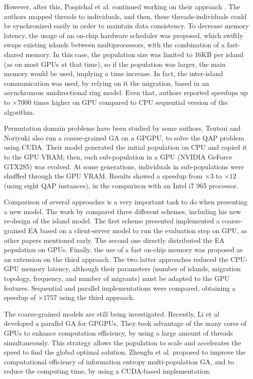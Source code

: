 \documentclass{article}
\begin{document}
However, after this, Pospichal et al. continued working on their approach \cite{pospichalParallelGeneticAlgorithOnCUDA2010,9253}. The authors mapped threads to individuals, and then, these threads-individuals could be synchronized easily in order to maintain data consistency. To decrease memory latency, the usage of an on-chip hardware scheduler was proposed, which swiftly swaps existing islands between multiprocessors, with the combination of a fast-shared memory. In this case, the population size was limited to 16KB per island (as on most GPUs at that time), so if the population was larger, the main memory would be used, implying a time increase. In fact, the inter-island communication was used, by relying on it the migration, based in an asynchronous unidirectional ring model. Even that, authors reported speedups up to $\times7000$ times higher on GPU compared to CPU sequential version of the algorithm.

Permutation domain problems have been studied by some authors. Tsutsui and Noriyuki \cite{1570355} also run a coarse-grained GA on a GPGPU, to solve the QAP problem using CUDA. Their model generated the initial population on CPU and copied it to the GPU VRAM; then, each sub-population in a GPU (NVIDIA GeForce GTX285) was evolved. At some generations, individuals in sub-populations were shuffled through the GPU VRAM. Results showed a speedup from $\times3$ to $\times12$ (using eight QAP instances), in the comparison with an Intel i7 965 processor.

Comparison of several approaches is a very important task to do when presenting a new model. The work by \cite{LUONG:2010:INRIA-00520464:1} compared three different schemes, including his new re-design of the island model. The first scheme presented implemented a coarse-grained EA based on a client-server model to run the evaluation step on GPU, as other papers mentioned early. The second one directly distributed the EA population on GPUs. Finally, the use of a fast on-chip memory was proposed as an extension on the third approach.
The two latter approaches reduced the CPU-GPU memory latency, although their parameters (number of islands, migration topology, frequency, and number of migrants) must be adapted to the GPU features. Sequential and parallel implementations were compared, obtaining a speedup of $\times1757$ using the third approach.


The coarse-grained models are still being investigated. Recently, Li
et al \cite{Li2016} developed a parallel GA for GPGPUs. They took
advantage of the many cores of GPUs to enhance computation efficiency,
by using a large amount of threads simultaneously. This strategy
allows the population to scale and accelerates the speed to find the
global optimal solution. Zhengfu et al. \cite{Zhengfu2016} proposed to
improve the computational efficiency of information entropy
multi-population GA, and to reduce the computing time, by using a
CUDA-based implementation. 
\end{document}
